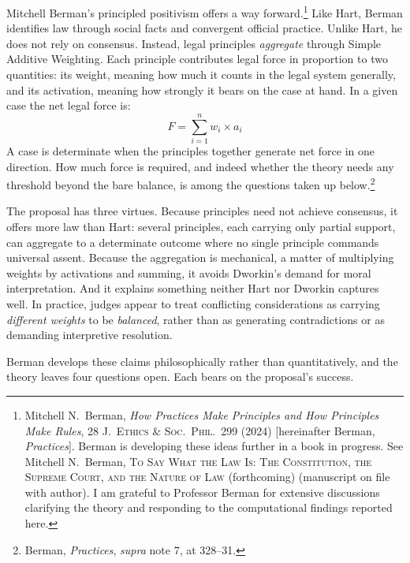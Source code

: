Mitchell Berman's principled positivism offers a way
forward.\footnote{Mitchell N.\ Berman, \textit{How Practices Make
Principles and How Principles Make Rules}, 28 \textsc{J.\ Ethics \& Soc.\
Phil.}\ 299 (2024) [hereinafter Berman, \textit{Practices}]. Berman is
developing these ideas further in a book in progress. See Mitchell N.\
Berman, \textsc{To Say What the Law Is: The Constitution, the Supreme
Court, and the Nature of Law} (forthcoming) (manuscript on file with
author). I am grateful to Professor Berman for extensive discussions
clarifying the theory and responding to the computational findings
reported here.} Like Hart, Berman identifies law through social facts and
convergent official practice. Unlike Hart, he does not rely on consensus.
Instead, legal principles \textit{aggregate} through Simple Additive
Weighting. Each principle contributes legal force in proportion to two
quantities: its weight, meaning how much it counts in the legal system
generally, and its activation, meaning how strongly it bears on the case at
hand. In a given
case the net legal force is:
%
\begin{equation}
F = \sum_{i=1}^{n} w_i \times a_i
\end{equation}
%
A case is determinate when the principles together generate net force in one
direction. How much force is required, and indeed whether the theory needs
any threshold beyond the bare balance, is among the questions taken up
below.\footnote{Berman, \textit{Practices}, \textit{supra} note 7, at
328--31.}

The proposal has three virtues. Because principles need not achieve
consensus, it offers more law than Hart: several principles, each carrying
only partial support, can aggregate to a determinate outcome where no single
principle commands universal assent. Because the aggregation is mechanical,
a matter of multiplying weights by activations and summing, it avoids
Dworkin's demand for moral interpretation. And it explains something neither Hart nor Dworkin captures well. In
practice, judges appear to treat conflicting considerations as carrying
\textit{different weights} to be \textit{balanced}, rather than as
generating contradictions or as demanding interpretive resolution.

Berman develops these claims philosophically rather than quantitatively,
and the theory leaves four questions open. Each bears on the proposal's
success.

